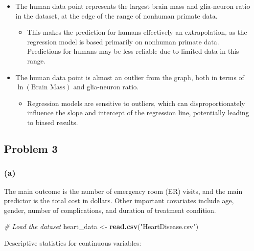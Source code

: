 \documentclass[
]{article}
\newenvironment{Shaded}{\begin{snugshade}}{\end{snugshade}}
\newcommand{\CommentTok}[1]{\textcolor[rgb]{0.56,0.35,0.01}{\textit{#1}}}
\newcommand{\FunctionTok}[1]{\textcolor[rgb]{0.13,0.29,0.53}{\textbf{#1}}}
\newcommand{\NormalTok}[1]{#1}
\newcommand{\OtherTok}[1]{\textcolor[rgb]{0.56,0.35,0.01}{#1}}
\newcommand{\StringTok}[1]{\textcolor[rgb]{0.31,0.60,0.02}{#1}}
\providecommand{\tightlist}{%
  \setlength{\itemsep}{0pt}\setlength{\parskip}{0pt}}
\begin{document}
\begin{itemize}
\item
  The human data point represents the largest brain mass and glia-neuron
  ratio in the dataset, at the edge of the range of nonhuman primate
  data.

  \begin{itemize}
  \tightlist
  \item
    This makes the prediction for humans effectively an extrapolation,
    as the regression model is based primarily on nonhuman primate data.
    Predictions for humans may be less reliable due to limited data in
    this range.
  \end{itemize}
\item
  The human data point is almost an outlier from the graph, both in
  terms of \(\ln(\text{Brain Mass})\) and glia-neuron ratio.

  \begin{itemize}
  \tightlist
  \item
    Regression models are sensitive to outliers, which can
    disproportionately influence the slope and intercept of the
    regression line, potentially leading to biased results.
  \end{itemize}
\end{itemize}

\subsection{Problem 3}\label{problem-3}

\subsubsection{(a)}\label{a-1}

The main outcome is the number of emergency room (ER) visits, and the
main predictor is the total cost in dollars. Other important covariates
include age, gender, number of complications, and duration of treatment
condition.

\begin{Shaded}
\begin{Highlighting}[]
\CommentTok{\# Load the dataset}
\NormalTok{heart\_data }\OtherTok{\textless{}{-}} \FunctionTok{read.csv}\NormalTok{(}\StringTok{"HeartDisease.csv"}\NormalTok{)}
\end{Highlighting}
\end{Shaded}

Descriptive statistics for continuous variables:
\end{document}
